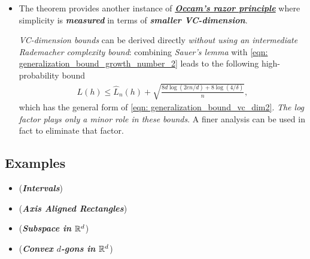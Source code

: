 \documentclass[11pt]{article}
\begin{document}
\begin{itemize}
\item \begin{remark}
The theorem provides another instance of \underline{\emph{\textbf{Occam's razor principle}}} where simplicity is \emph{\textbf{measured}} in terms of \emph{\textbf{smaller VC-dimension}}.

\emph{VC-dimension bounds} can be derived directly \emph{without using an intermediate Rademacher complexity bound}: combining \emph{Sauer’s lemma} with \eqref{eqn: generalization_bound_growth_number_2} leads to the following high-probability bound
\begin{align}
L(h) \le \widehat{L}_{n}(h) + \sqrt{\frac{8d\log(2en /d) + 8\log(4/\delta)}{n}},  \label{eqn: generalization_bound_vc_dim3}
\end{align}
which has the general form of \eqref{eqn: generalization_bound_vc_dim2}. \emph{The log factor plays only a minor role in these bounds}. A finer analysis can be used in fact to eliminate that factor.
\end{remark}

\end{itemize}

\subsection{Examples}
\begin{itemize}
\item \begin{example}(\textbf{\emph{Intervals}})\\
\end{example}

\item \begin{example}(\textbf{\emph{Axis Aligned Rectangles}})\\
\end{example}

\item \begin{example}(\textbf{\emph{Subspace in ${\mathbb R}^d$}})\\
\end{example}

\item \begin{example}(\textbf{\emph{Convex $d$-gons in ${\mathbb R}^d$}})
\end{example}
\end{itemize}
\end{document}
